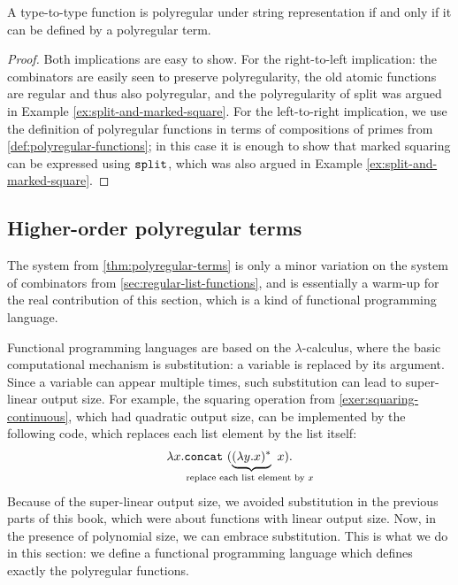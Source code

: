 \begin{theorem}  \label{thm:polyregular-terms} A type-to-type function is polyregular under string representation  if and only if it can be defined by a polyregular term.
\end{theorem}
\begin{proof}
    Both implications are easy to show. 
    For the right-to-left implication: the combinators are easily seen to preserve polyregularity, the old atomic functions are regular and thus also polyregular, and the polyregularity of split was argued in Example \ref{ex:split-and-marked-square}. For the left-to-right implication, we use the definition of polyregular functions in terms of compositions of primes from \cref{def:polyregular-functions}; in this case it is enough to show that marked squaring can be expressed using $\mathtt{split}$, which was also argued in Example \ref{ex:split-and-marked-square}.
\end{proof}











\subsection{Higher-order polyregular terms}
\label{sec:syntax-and-semantics-of-higher-order-terms}

The system from \cref{thm:polyregular-terms} is only a minor variation on the system of combinators from \cref{sec:regular-list-functions}, and is essentially a warm-up for the real contribution of this section, which is a kind of functional programming language. 

Functional programming languages are based on the $\lambda$-calculus, where the  basic computational mechanism  is substitution:  a variable is replaced by its argument. Since a variable can appear multiple times, such substitution can lead to super-linear output size. For example, the squaring operation from \cref{exer:squaring-continuous}, which had quadratic output size, can be implemented by the following  code, which replaces each list element by the list itself:
\begin{align*}
\lambda x. \concatterm\ ( \myunderbrace{(\lambda y. x)^*}{replace each list element by $x$}\  x).
\end{align*}
Because of the super-linear output size, we avoided substitution in the previous parts of this book, which were about functions with linear output size.
Now, in the presence of polynomial size, we can  embrace substitution. This is what we do in this section: we define a functional programming language which defines exactly the polyregular functions. 

